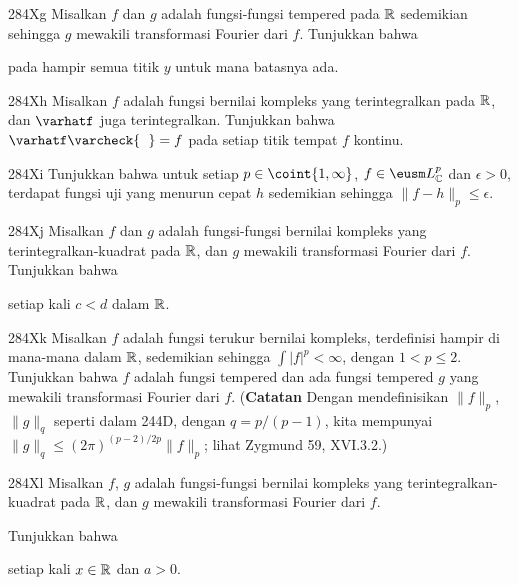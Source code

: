 {\sqheader 284Xg Misalkan $f$ dan $g$ adalah fungsi-fungsi tempered pada
$\Bbb R$ sedemikian sehingga $g$ mewakili transformasi Fourier dari $f$.
Tunjukkan bahwa


\noindent pada hampir semua titik $y$ untuk mana batasnya ada.  %

\sqheader 284Xh Misalkan $f$ adalah fungsi bernilai kompleks yang terintegralkan
pada $\Bbb R$, dan $\varhatf$ juga terintegralkan. Tunjukkan bahwa
$\varhatf\varcheck{\phantom{f}}=f$ pada setiap titik tempat $f$ kontinu. %

\spheader 284Xi Tunjukkan bahwa untuk setiap $p\in\coint{1,\infty}$,
$f\in\eusm L_{\Bbb C}^p$ dan $\epsilon>0$, terdapat fungsi uji yang menurun
cepat $h$ sedemikian sehingga $\|f-h\|_p\le\epsilon$.

\sqheader 284Xj Misalkan $f$ dan $g$ adalah fungsi-fungsi bernilai kompleks
yang terintegralkan-kuadrat pada $\Bbb R$, dan $g$ mewakili transformasi
Fourier dari $f$. Tunjukkan bahwa


\noindent setiap kali $c<d$ dalam $\Bbb R$. %

\spheader 284Xk Misalkan $f$ adalah fungsi terukur bernilai kompleks,
terdefinisi hampir di mana-mana dalam $\Bbb R$, sedemikian sehingga
$\int|f|^p<\infty$, dengan $1<p\le 2$. Tunjukkan bahwa $f$ adalah fungsi
tempered dan ada fungsi tempered $g$ yang mewakili transformasi Fourier dari
$f$.  ({\bf Catatan} Dengan mendefinisikan
$\|f\|_p$, $\|g\|_q$ seperti dalam 244D, dengan $q=p/(p-1)$, kita mempunyai
$\|g\|_q\le(2\pi)^{(p-2)/2p}\|f\|_p$; lihat {\smc Zygmund 59}, XVI.3.2.)

\spheader 284Xl Misalkan $f$, $g$ adalah fungsi-fungsi bernilai kompleks yang
terintegralkan-kuadrat pada $\Bbb R$, dan $g$ mewakili transformasi Fourier
dari $f$.

 Tunjukkan bahwa


\noindent setiap kali $x\in\Bbb R$ dan $a>0$. 

}
